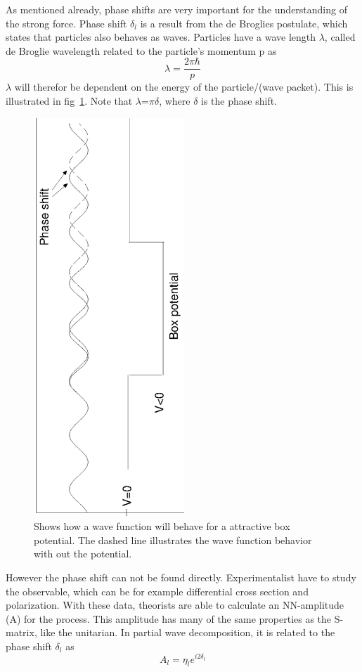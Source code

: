 As mentioned already, phase shifts are very important for the understanding of the strong force.
Phase shift $\delta_l$ is a result from the de Broglies postulate, which states that particles also behaves as waves.
Particles have  a wave length $\lambda$, called de Broglie wavelength related to the particle's momentum p as
\begin{equation}\label{eq:Broglie}
\lambda=\frac{2\pi\hbar}{p}
\end{equation}
$\lambda$ will therefor be dependent on the energy of the particle/(wave packet). This is illustrated
in fig~\ref{fig:ilusterendeFaseskift}. Note that $\lambda$=$\pi\delta$, where $\delta$ is the phase shift.
\begin{flushleft}   
\begin{figure}\label{fig:ilusterendeFaseskift}
\centering
\includegraphics[height=15cm,angle=-90]{detteerfaseskift.eps}
\caption{Shows how a wave function will behave for a attractive box potential. The dashed line
illustrates the wave function behavior with out the potential.}
\end{figure}
\end{flushleft} 
However the phase shift can not be found directly. Experimentalist have to study the observable, 
which can be for example differential cross section and polarization. With these data, theorists are
able to calculate an NN-amplitude (A) for the process. This amplitude has many of the same properties as the S-matrix,
like the unitarian. In partial wave decomposition, it is related to the phase shift $\delta_l$ as
\begin{equation}
A_l=\eta_l e^{i2\delta_l}
\end{equation}

